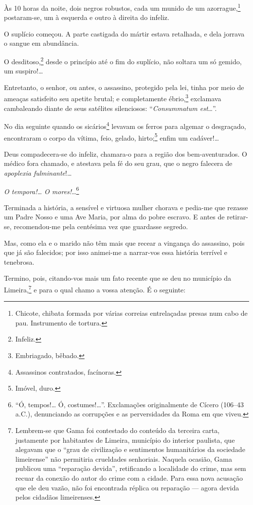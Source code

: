 {Às 10 horas da noite, dois negros robustos, cada um munido de um
azorrague,\footnote{Chicote, chibata formada por várias correias
  entrelaçadas presas num cabo de pau. Instrumento de tortura.}
postaram-se, um à esquerda e outro à direita do infeliz.

O suplício começou. A parte castigada do mártir estava retalhada, e dela
jorrava o sangue em abundância.

O desditoso,\footnote{Infeliz.} desde o princípio até o fim do
suplício, não soltara um só gemido, um suspiro!\ldots{}

Entretanto, o senhor, ou antes, o assassino, protegido pela lei, tinha
por meio de ameaças satisfeito seu apetite brutal; e completamente
ébrio,\footnote{Embriagado, bêbado.} exclamava cambaleando diante de
seus satélites silenciosos:
``\emph{Consummatum est}\ldots{}''.

No dia seguinte quando os sicários\footnote{Assassinos contratados,
  facínoras.} levavam os ferros para algemar o desgraçado, encontraram o
corpo da vítima, feio, gelado, hirto;\footnote{Imóvel, duro.} enfim um
cadáver!\ldots{}

Deus compadecera-se do infeliz, chamara-o para a região dos
bem-aventurados. O médico fora chamado, e atestava pela fé do seu grau,
que o negro falecera de \emph{apoplexia fulminante}!\ldots{}

\emph{O tempora!\ldots{} O mores!}\ldots{}\footnote{``Ó, tempos!\ldots{} Ó,
  costumes!\ldots{}''. Exclamações originalmente de Cícero (106--43 a.C.), 
  denunciando as corrupções e as perversidades da Roma em que viveu.}

Terminada a história, a sensível e virtuosa mulher chorava e pedia-me
que rezasse um Padre Nosso e uma Ave Maria, por alma do pobre escravo. E
antes de retirar-se, recomendou-me pela centésima vez que guardasse
segredo.

Mas, como ela e o marido não têm mais que recear a vingança do
assassino, pois que já são falecidos; por isso animei-me a narrar-vos
essa história terrível e tenebrosa.

Termino, pois, citando-vos mais um fato recente que se deu no município
da Limeira,\footnote{Lembrem-se que Gama foi contestado do conteúdo da
  terceira carta, justamente por habitantes de Limeira, município do
  interior paulista, que alegavam que o ``grau de civilização e
  sentimentos humanitários da sociedade limeirense'' não permitiria
  crueldades senhoriais. Naquela ocasião, Gama publicou uma ``reparação
  devida'', retificando a localidade do crime, mas sem recuar da conexão
  do autor do crime com a cidade. Para essa nova acusação que ele deu vazão,
  não foi encontrada réplica ou reparação --- agora devida pelos
  cidadãos limeirenses.} e para o qual chamo a vossa atenção. É o
seguinte:

}

